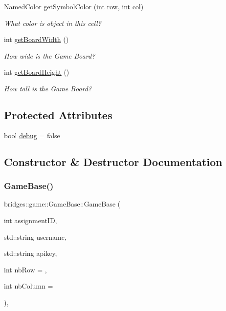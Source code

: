 \begin{DoxyCompactItemize}
\hyperlink{namespacebridges_1_1game_afaa832a4322b25b6a4ebfba832f10f26}{Named\+Color} \hyperlink{classbridges_1_1game_1_1_game_base_a26c9f9547cc6f992a829ce5d6edd8f85}{get\+Symbol\+Color} (int row, int col)
\begin{DoxyCompactList}\small\item\em What color is object in this cell? \end{DoxyCompactList}\item 
int \hyperlink{classbridges_1_1game_1_1_game_base_ad74bf992cced25e9997fbf8a63bf8157}{get\+Board\+Width} ()
\begin{DoxyCompactList}\small\item\em How wide is the Game Board? \end{DoxyCompactList}\item 
int \hyperlink{classbridges_1_1game_1_1_game_base_a14510d6685e0b224c8995e397ad64adc}{get\+Board\+Height} ()
\begin{DoxyCompactList}\small\item\em How tall is the Game Board? \end{DoxyCompactList}\end{DoxyCompactItemize}
\subsection*{Protected Attributes}
\begin{DoxyCompactItemize}
\item 
bool \hyperlink{classbridges_1_1game_1_1_game_base_ad2af01edd927a31613d3b881286541bb}{debug} = false
\end{DoxyCompactItemize}


\subsection{Constructor \& Destructor Documentation}
\mbox{\label{classbridges_1_1game_1_1_game_base_abd73825c57a10d28191a3f1162eb9bd8}} 
\subsubsection{\texorpdfstring{Game\+Base()}{GameBase()}}
{\footnotesize\ttfamily bridges\+::game\+::\+Game\+Base\+::\+Game\+Base (\begin{DoxyParamCaption}\item[{int}]{assignment\+ID,  }\item[{std\+::string}]{username,  }\item[{std\+::string}]{apikey,  }\item[{int}]{nb\+Row = {},  }\item[{int}]{nb\+Column = {} }\end{DoxyParamCaption})\hspace{0.3cm}{\ttfamily [inline]}, {\ttfamily [protected]}}

